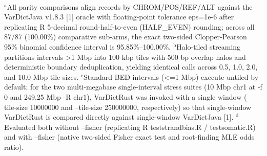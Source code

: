 \begin{table}[htbp]
\\[4pt]\footnotesize{$^{\text{a}}$All parity comparisons align records by CHROM/POS/REF/ALT against the VarDictJava v1.8.3 [1] oracle with floating-point tolerance eps=1e-6 after replicating R 5-decimal round-half-to-even (HALF\_EVEN) rounding; across all 87/87 (100.00\%) comparative sub-arms, the exact two-sided Clopper-Pearson 95\% binomial confidence interval is 95.85\%--100.00\%. $^{\text{b}}$Halo-tiled streaming partitions intervals \textgreater{}1 Mbp into 100 kbp tiles with 500 bp overlap halos and deterministic boundary deduplication, yielding identical calls across 0.5, 1.0, 2.0, and 10.0 Mbp tile sizes. $^{\text{c}}$Standard BED intervals (\textless{}=1 Mbp) execute untiled by default; for the two multi-megabase single-interval stress suites (10 Mbp chr1 at -f 0 and 249.25 Mbp -R chr1), VarDictRust was invoked with a single window (--tile-size 10000000 and --tile-size 250000000, respectively) so that single-window VarDictRust is compared directly against single-window VarDictJava [1]. $^{\text{d}}$Evaluated both without --fisher (replicating R teststrandbias.R / testsomatic.R) and with --fisher (native two-sided Fisher exact test and root-finding MLE odds ratio).}
\end{table}
